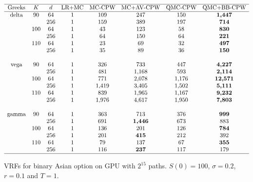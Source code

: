 \begin{table}[!h]
\centering
$\begin{array}{ c c c c c c c c } 
 \hline
 \text{Greeks} & K & d & \text{LR+MC} & \text{MC-CPW} & \text{MC+AV-CPW} & \text{QMC-CPW} & \text{QMC+BB-CPW} \\
 \hline
 \text{delta} & 90  & 64  & 1 & 109 & 247 & 150 & \boldsymbol{1{,}447} \\ 
              &     & 256 & 1 & 159 & 389 & 197 & \boldsymbol{714} \\
              & 100 & 64  & 1 & 43  & 123 & 58  & \boldsymbol{830} \\
              &     & 256 & 1 & 64  & 150 & 64  & \boldsymbol{221} \\
              & 110 & 64  & 1 & 23  & 69  & 32  & \boldsymbol{497} \\
              &     & 256 & 1 & 35  & 89  & 36  & \boldsymbol{150} \\
 \\
 \text{vega} & 90  & 64  & 1 & 326     & 733     & 447     & \boldsymbol{4{,}227} \\ 
             &     & 256 & 1 & 481     & 1{,}168 & 593     & \boldsymbol{2{,}114} \\
             & 100 & 64  & 1 & 771     & 2{,}078 & 1{,}176 & \boldsymbol{12{,}571} \\
             &     & 256 & 1 & 1{,}419 & 3{,}405 & 1{,}502 & \boldsymbol{5{,}111} \\
             & 110 & 64  & 1 & 839     & 1{,}965 & 1{,}167 & \boldsymbol{9{,}232} \\
             &     & 256 & 1 & 1{,}976 & 4{,}617 & 1{,}950 & \boldsymbol{7{,}803} \\
 \\
 \text{gamma} & 90  & 64  & 1 & 363 & 713                  & 376 & \boldsymbol{999} \\ 
              &     & 256 & 1 & 691 & \boldsymbol{1{,}446} & 673 & 883 \\
              & 100 & 64  & 1 & 136 & 201                  & 126 & \boldsymbol{784} \\
              &     & 256 & 1 & 201 & \boldsymbol{415}     & 212 & 392 \\
              & 110 & 64  & 1 & 79  & 137                  & 67  & \boldsymbol{355} \\
              &     & 256 & 1 & 116 & \boldsymbol{237}     & 117 & 179 \\
 \hline
\end{array}$
\caption{VRFs for binary Asian option on GPU with $2^{15}$ paths. $S(0) = 100$, $\sigma = 0.2$, $r = 0.1$ and $T = 1$.}
\label{tbl:vrfs-binary}
\end{table}

